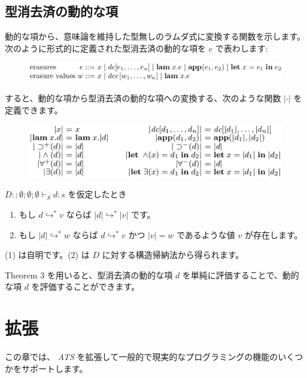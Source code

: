 \documentclass[submit,techreq,noauthor,onecolumn]{ipsj}
\begin{document}
\subsection{型消去済の動的な項}

動的な項から、意味論を維持した型無しのラムダ式に変換する関数を示します。
次のように形式的に定義された型消去済の動的な項を $e$ で表わします:

\begin{figure}[h]
\centering
\includegraphics[width=13cm]{img/infig3_erasure.png}
\end{figure}

\noindent すると、動的な項から型消去済の動的な項への変換する、次のような関数 $|\cdot|$ を定義できます。

\begin{figure}[h]
\centering
\includegraphics[width=12cm]{img/infig3_trans_erasure.png}
\end{figure}

$D :: \emptyset; \emptyset; \emptyset \vdash_S d : s$ を仮定したとき

\begin{enumerate}
  \item もし $d \hookrightarrow^* v$ ならば $|d| \hookrightarrow^* |v|$ です。
  \item もし $|d| \hookrightarrow^* w$ ならば $d \hookrightarrow^* v$ かつ $|v| = w$ であるような値 $v$ が存在します。
\end{enumerate}

(1) は自明です。(2) は $D$ に対する構造帰納法から得られます。

\noindent Theorem 3 を用いると、型消去済の動的な項 $d$ を単純に評価することで、動的な項 $d$ を評価することができます。

\section{拡張}

この章では、 {\it ATS} を拡張して一般的で現実的なプログラミングの機能のいくつかをサポートします。
\end{document}
